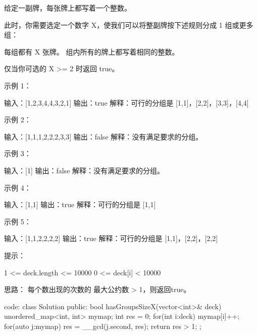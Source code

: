 给定一副牌，每张牌上都写着一个整数。

此时，你需要选定一个数字 X，使我们可以将整副牌按下述规则分成 1 组或更多组：

    每组都有 X 张牌。
    组内所有的牌上都写着相同的整数。

仅当你可选的 X >= 2 时返回 true。

 

示例 1：

输入：[1,2,3,4,4,3,2,1]
输出：true
解释：可行的分组是 [1,1]，[2,2]，[3,3]，[4,4]

示例 2：

输入：[1,1,1,2,2,2,3,3]
输出：false
解释：没有满足要求的分组。

示例 3：

输入：[1]
输出：false
解释：没有满足要求的分组。

示例 4：

输入：[1,1]
输出：true
解释：可行的分组是 [1,1]

示例 5：

输入：[1,1,2,2,2,2]
输出：true
解释：可行的分组是 [1,1]，[2,2]，[2,2]


提示：

    1 <= deck.length <= 10000
    0 <= deck[i] < 10000






















思路：
每个数出现的次数的 最大公约数 > 1，则返回true。






























code:
class Solution {
public:
    bool hasGroupsSizeX(vector<int>& deck) {
        unordered_map<int, int> mymap;
        int res = 0;
        for(int i:deck) mymap[i]++;
        for(auto j:mymap) res = __gcd(j.second, res);
        return res > 1;
    }
};